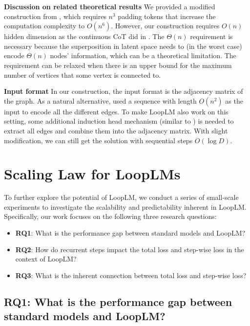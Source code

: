 \documentclass[]{bytedance_seed}
\newcommand{\1}{\mathbf{1}}
\newcommand{\ut}{LoopLM}
\begin{document}
\textbf{Discussion on related theoretical results} We provided a modified construction from \cite{merrill2025little}, which requires $n^3$ padding tokens that increase the computation complexity to $O(n^6)$. However, our construction requires $O(n)$ hidden dimension as the continuous CoT did in \cite{zhu2025reasoning}. The $\Theta(n)$ requirement is necessary because the superposition in latent space needs to (in the worst case) encode $\Theta(n)$ nodes' information, which can be a theoretical limitation. The requirement can be relaxed when there is an upper bound for the maximum number of vertices that some vertex is connected to. 

\textbf{Input format} In our construction, the input format is the adjacency matrix of the graph. As a natural alternative, \cite{zhu2025reasoning} used a sequence with length $O(n^2)$ as the input to encode all the different edges. To make \ut{} also work on this setting, some additional induction head mechanism (similar to \cite{zhu2025reasoning}) is needed to extract all edges and combine them into the adjacency matrix. With slight modification, we can still get the solution with sequential steps $O(\log D)$.

\section{Scaling Law for \ut{}s}

To further explore the potential of \ut{}, we conduct a series of small-scale experiments to investigate the scalability and predictability inherent in \ut{}. Specifically, our work focuses on the following three research questions:

\begin{itemize}[itemsep=0.0pt,topsep=0pt,leftmargin=*]
    \item \textbf{RQ1}: What is the performance gap between standard models and \ut{}?
    \item \textbf{RQ2}: How do recurrent steps impact the total loss and step-wise loss in the context of \ut{}?
    \item \textbf{RQ3}: What is the inherent connection between total loss and step-wise loss?
\end{itemize}


\subsection{RQ1: What is the performance gap between standard models and \ut{}?}
\label{scaling_law_sub_1}
\end{document}
